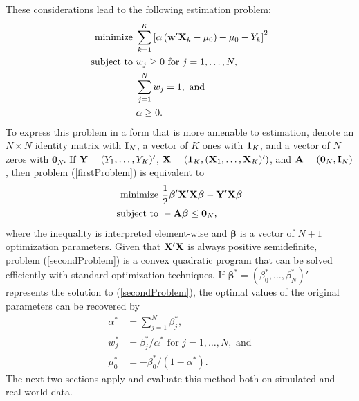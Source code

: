 \documentclass[12pt]{article}
\theoremstyle{definition}
\theoremstyle{definition}
\def\one{{\bf 1}}
\def\w{{\bf w}}
\def\A{{\bf A}}
\def\X{{\bf X}}
\def\Y{{\bf Y}}
\def\Beta{\boldsymbol{\beta}}
\def\I{{\bf I}}
\begin{document}
These considerations lead to the following estimation problem:
\begin{align}
 \label{firstProblem}
 \begin{split}
\text{minimize } & \sum_{k=1}^K \left[ \alpha  \left(  \w'\X_{k} - \mu_0\right) + \mu_0 - Y_k \right]^2\\
\text{subject to } & w_j \geq 0 \text{ for } j = 1, \dots, N,\\
& \sum_{j=1}^N w_j = 1, \text{ and }\\
& \alpha \geq 0.
\end{split}
\end{align}
To express this problem in a form that is more amenable to estimation, denote an $N \times N$ identity matrix with $\I_N$,  a vector of $K$ ones with $\one_K$, and a vector of $N$ zeros with $\boldsymbol{0}_N$. If $\Y = (Y_1, \dots, Y_K)'$, $\X = (\one_K, (\X_1, \dots, \X_K)')$, and $\A = (\boldsymbol{0}_N, \I_N)$, then  problem (\ref{firstProblem}) is equivalent to
\begin{align}
 \label{secondProblem}
 \begin{split}
\text{minimize } & \frac{1}{2} \Beta' \X'\X \Beta - \Y'\X\Beta\\
\text{subject to } & -\A\Beta \leq \boldsymbol{0}_N,
\end{split}
\end{align}
where the inequality is interpreted element-wise and $\Beta$ is a vector of $N+1$ optimization parameters. Given that $\X'\X$ is always positive semidefinite, problem (\ref{secondProblem}) is a convex quadratic program that can be solved efficiently with standard optimization techniques. 
 If $\Beta^* = (\beta_0^*, \dots, \beta_{N}^*)'$ represents the solution to (\ref{secondProblem}), the optimal values of the original parameters can be recovered by
\begin{align*}
\alpha^* &= \sum_{j=1}^N \beta_j^*,\\
w_j^* &=  \beta_j^*/\alpha^* \text{ for } j = 1, \dots, N, \text{ and}\\
\mu_0^* &= -\beta_0^*/(1-\alpha^*).
\end{align*}
The next two sections apply and evaluate this method both on simulated and real-world data. 
\end{document}
